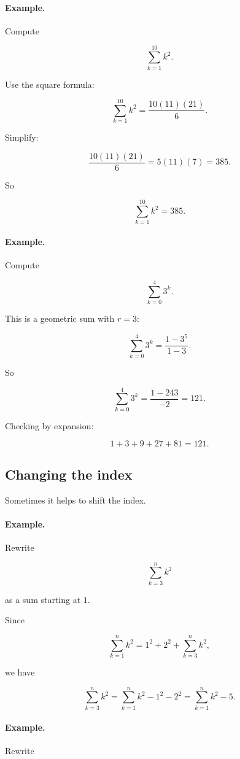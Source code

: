\paragraph{Example.}
Compute

\[
\sum_{k=1}^{10} k^2.
\]

Use the square formula:

\[
\sum_{k=1}^{10}k^2
=
\frac{10(11)(21)}6.
\]

Simplify:

\[
\frac{10(11)(21)}6
=
5(11)(7)
=
385.
\]

So

\[
\boxed{
\sum_{k=1}^{10} k^2=385.
}
\]

\paragraph{Example.}
Compute

\[
\sum_{k=0}^{4} 3^k.
\]

This is a geometric sum with \(r=3\):

\[
\sum_{k=0}^{4}3^k
=
\frac{1-3^5}{1-3}.
\]

So

\[
\sum_{k=0}^{4}3^k
=
\frac{1-243}{-2}
=
121.
\]

Checking by expansion:

\[
1+3+9+27+81=121.
\]

\subsection{Changing the index}
\label{appsubsec:changing-index}

Sometimes it helps to shift the index.

\paragraph{Example.}
Rewrite

\[
\sum_{k=3}^{n} k^2
\]

as a sum starting at \(1\).

Since

\[
\sum_{k=1}^{n} k^2
=
1^2+2^2+\sum_{k=3}^{n} k^2,
\]

we have

\[
\boxed{
\sum_{k=3}^{n} k^2
=
\sum_{k=1}^{n} k^2-1^2-2^2
=
\sum_{k=1}^{n} k^2-5.
}
\]

\paragraph{Example.}
Rewrite

